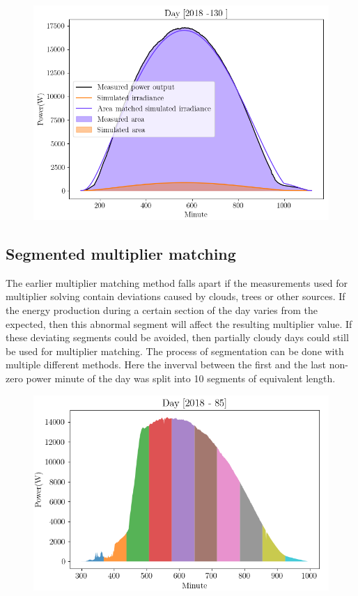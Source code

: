 \begin{figure}[h]
\centering
\includegraphics[width=0.6\linewidth]{pics/areamatching2}
\label{fig_area_match}
\end{figure}


\newpage

\subsection{Segmented multiplier matching}


\noindent The earlier multiplier matching method falls apart if the measurements used for multiplier solving contain deviations caused by clouds, trees or other sources. If the energy production during a certain section of the day varies from the expected, then this abnormal segment will affect the resulting multiplier value. If these deviating segments could be avoided, then partially cloudy days could still be used for multiplier matching. The process of segmentation can be done with multiple different methods. Here the inverval between the first and the last non-zero power minute of the day was split into 10 segments of equivalent length.




\begin{figure}[h]
\centering
\includegraphics[width=0.8\linewidth]{pics/10segmentcloudy}
\label{fig_segment_match_segments}
\end{figure}


